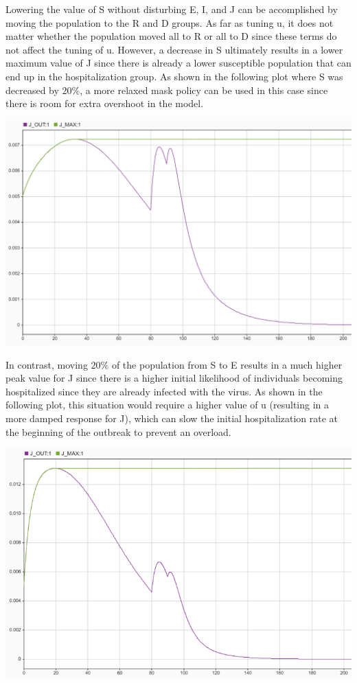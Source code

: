 \documentclass[fleqn]{article}
\begin{document}
Lowering the value of S without disturbing E, I, and J can be accomplished by moving the population to the R and D groups. As far as tuning u, it does not matter whether the population moved all to R or all to D since these terms do not affect the tuning of u. However, a decrease in S ultimately results in a lower maximum value of J since there is already a lower susceptible population that can end up in the hospitalization group. As shown in the following plot where S was decreased by $20\%$, a more relaxed mask policy can be used in this case since there is room for extra overshoot in the model.

\begin{center}
    \includegraphics[width=0.7\linewidth]{init_conditions_lower_s}
\end{center}

In contrast, moving $20\%$ of the population from S to E results in a much higher peak value for J since there is a higher initial likelihood of individuals becoming hospitalized since they are already infected with the virus. As shown in the following plot, this situation would require a higher value of u (resulting in a more damped response for J), which can slow the initial hospitalization rate at the beginning of the outbreak to prevent an overload.

\begin{center}
    \includegraphics[width=0.7\linewidth]{init_conditions_higher_e}
\end{center}
\end{document}
